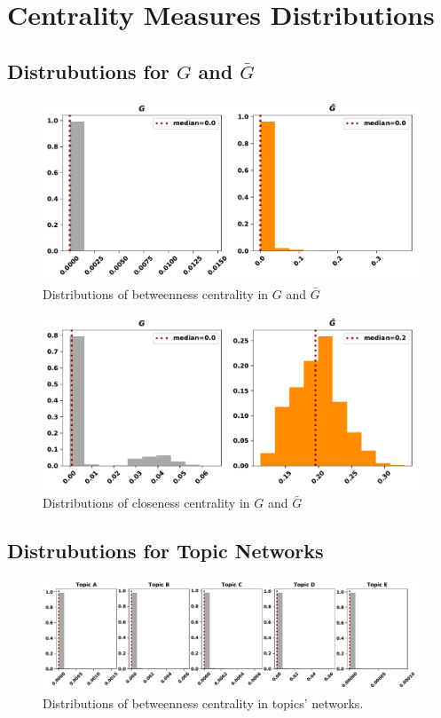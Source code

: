 \documentclass{article}
\theoremstyle{definition}
\begin{document}
\section{Centrality Measures Distributions}

\subsection{Distrubutions for \(G\) and \(\bar{G}\)}

\begin{figure}[!hbtp]
    \centering
    \includegraphics[width=.8\textwidth]{./assets/images/pd_betweeness_centralities.pdf}
    \caption{Distributions of betweenness centrality in \(G\) and \(\bar{G}\)}
    \label{fig:bc_distributions}
\end{figure}

\begin{figure}[!hbtp]
    \centering
    \includegraphics[width=.8\textwidth]{./assets/images/pd_closeness_centralities.pdf}
    \caption{Distributions of closeness centrality in \(G\) and \(\bar{G}\)}
    \label{fig:cc_distributions}
\end{figure}

\subsection{Distrubutions for Topic Networks}\label{appendix:distributions}

\begin{figure}[!hbtp]
    \centering
    \includegraphics[width=\textwidth]{./assets/images/topics_betweeness_distributions.pdf}
    \caption{Distributions of betweenness centrality in topics' networks.}
    \label{fig:bc_distributions_topics}
\end{figure}
\end{document}

